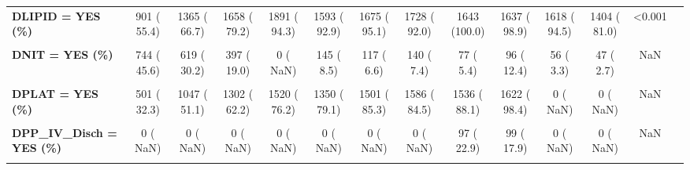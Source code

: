 \documentclass[
]{article}
\begin{document}
\begin{table}[H]
\begin{tabular}[t]{>{\raggedright\arraybackslash}p{5em}ccccccccccccc}
\textbf{DLIPID = YES (\%)} & 901 ( 55.4) & 1365 ( 66.7) & 1658 ( 79.2) & 1891 ( 94.3) & 1593 ( 92.9) & 1675 ( 95.1) & 1728 ( 92.0) & 1643 (100.0) & 1637 ( 98.9) & 1618 ( 94.5) & 1404 ( 81.0) & <0.001 & \\
\textbf{\cellcolor{gray!10}{DLMW = YES (\%)}} & \cellcolor{gray!10}{270 ( 17.0)} & \cellcolor{gray!10}{352 ( 17.2)} & \cellcolor{gray!10}{264 ( 12.6)} & \cellcolor{gray!10}{211 ( 10.8)} & \cellcolor{gray!10}{143 (  8.4)} & \cellcolor{gray!10}{105 (  6.0)} & \cellcolor{gray!10}{176 (  9.4)} & \cellcolor{gray!10}{85 (  4.9)} & \cellcolor{gray!10}{61 (  6.0)} & \cellcolor{gray!10}{0 (  NaN)} & \cellcolor{gray!10}{0 (  NaN)} & \cellcolor{gray!10}{NaN} & \cellcolor{gray!10}{}\\
\textbf{DNIT = YES (\%)} & 744 ( 45.6) & 619 ( 30.2) & 397 ( 19.0) & 0 (  NaN) & 145 (  8.5) & 117 (  6.6) & 140 (  7.4) & 77 (  5.4) & 96 ( 12.4) & 56 (  3.3) & 47 (  2.7) & NaN & \\
\textbf{\cellcolor{gray!10}{DP2Y12 = YES (\%)}} & \cellcolor{gray!10}{0 (  NaN)} & \cellcolor{gray!10}{0 (  NaN)} & \cellcolor{gray!10}{0 (  NaN)} & \cellcolor{gray!10}{0 (  NaN)} & \cellcolor{gray!10}{1350 ( 79.1)} & \cellcolor{gray!10}{1501 ( 85.3)} & \cellcolor{gray!10}{1586 ( 84.5)} & \cellcolor{gray!10}{1536 ( 88.1)} & \cellcolor{gray!10}{1622 ( 98.1)} & \cellcolor{gray!10}{1495 ( 87.3)} & \cellcolor{gray!10}{1286 ( 74.1)} & \cellcolor{gray!10}{NaN} & \cellcolor{gray!10}{}\\
\textbf{DPLAT = YES (\%)} & 501 ( 32.3) & 1047 ( 51.1) & 1302 ( 62.2) & 1520 ( 76.2) & 1350 ( 79.1) & 1501 ( 85.3) & 1586 ( 84.5) & 1536 ( 88.1) & 1622 ( 98.4) & 0 (  NaN) & 0 (  NaN) & NaN & \\
\textbf{\cellcolor{gray!10}{DPP\_IV\_Chron = YES (\%)}} & \cellcolor{gray!10}{0 (  NaN)} & \cellcolor{gray!10}{0 (  NaN)} & \cellcolor{gray!10}{0 (  NaN)} & \cellcolor{gray!10}{0 (  NaN)} & \cellcolor{gray!10}{0 (  NaN)} & \cellcolor{gray!10}{0 (  NaN)} & \cellcolor{gray!10}{0 (  NaN)} & \cellcolor{gray!10}{105 ( 16.9)} & \cellcolor{gray!10}{117 ( 21.5)} & \cellcolor{gray!10}{0 (  NaN)} & \cellcolor{gray!10}{0 (  NaN)} & \cellcolor{gray!10}{NaN} & \cellcolor{gray!10}{}\\
\textbf{DPP\_IV\_Disch = YES (\%)} & 0 (  NaN) & 0 (  NaN) & 0 (  NaN) & 0 (  NaN) & 0 (  NaN) & 0 (  NaN) & 0 (  NaN) & 97 ( 22.9) & 99 ( 17.9) & 0 (  NaN) & 0 (  NaN) & NaN & \\
\textbf{\cellcolor{gray!10}{DPP\_IV\_Hosp = YES (\%)}} & \cellcolor{gray!10}{0 (  NaN)} & \cellcolor{gray!10}{0 (  NaN)} & \cellcolor{gray!10}{0 (  NaN)} & \cellcolor{gray!10}{0 (  NaN)} & \cellcolor{gray!10}{0 (  NaN)} & \cellcolor{gray!10}{0 (  NaN)} & \cellcolor{gray!10}{0 (  NaN)} & \cellcolor{gray!10}{48 ( 11.9)} & \cellcolor{gray!10}{101 ( 18.2)} & \cellcolor{gray!10}{0 (  NaN)} & \cellcolor{gray!10}{0 (  NaN)} & \cellcolor{gray!10}{NaN} & \cellcolor{gray!10}{}\\

\end{tabular}
\end{table}
\end{document}
